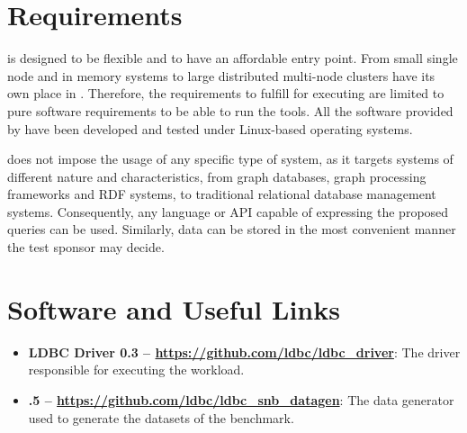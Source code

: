 

\section{Requirements}

\ldbcsnb is designed to be flexible and to have an affordable entry point.
From small single node and in memory systems to large distributed multi-node
clusters have its own place in \ldbcsnb.  Therefore, the requirements to
fulfill for executing \ldbcsnb are limited to pure software requirements to be
able to run the tools. All the software provided by \ldbcsnb have been
developed and tested under Linux-based operating systems.

\ldbcsnb does not impose the usage of any specific type of system, as it
targets systems of different nature and characteristics, from graph databases,
graph processing frameworks and RDF systems, to traditional relational database
management systems. Consequently, any language or API capable of expressing the
proposed queries can be used. Similarly, data can be stored in the most
convenient manner the test sponsor may decide.


\section{Software and Useful Links}

\begin{itemize}
    \item \textbf{LDBC Driver 0.3 -- \url{https://github.com/ldbc/ldbc_driver}}: The driver
    responsible for executing the \ldbcsnb workload.
    \item \textbf{.5 -- \url{https://github.com/ldbc/ldbc_snb_datagen}}: The data
    generator used to generate the datasets of the benchmark.
\end{itemize}





